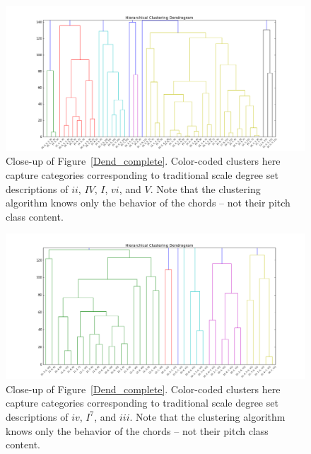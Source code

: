 \begin{figure}
	\centering
	\includegraphics[width=6in]{Dend_ii_IV_I_vi_V.png}
	\caption{Close-up of Figure~\ref{Dend_complete}.  Color-coded clusters here capture categories corresponding to traditional scale degree set descriptions of $ii$, $IV$, $I$, $vi$, and $V$.  Note that the clustering algorithm knows only the behavior of the chords -- not their pitch class content.}
	\label{Dend_sub1}
\end{figure}
\begin{figure}
	\centering
	\includegraphics[width=6in]{Dend_iv_I7_iii.png}
	\caption{Close-up of Figure~\ref{Dend_complete}.  Color-coded clusters here capture categories corresponding to traditional scale degree set descriptions of $iv$, $I^7$, and $iii$.  Note that the clustering algorithm knows only the behavior of the chords -- not their pitch class content.}
	\label{Dend_sub2}
\end{figure}

